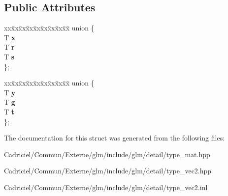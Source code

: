 \subsection*{Public Attributes}
\begin{DoxyCompactItemize}
\item 
\begin{tabbing}
xx\=xx\=xx\=xx\=xx\=xx\=xx\=xx\=xx\=\kill
union \{\\
\>T {\bfseries x}\\
\>T {\bfseries r}\\
\>T {\bfseries s}\\
\}; \hypertarget{structglm_1_1detail_1_1tvec2_afd7f3368f7e15406737f8fdcfa9a5ff3}{}\label{structglm_1_1detail_1_1tvec2_afd7f3368f7e15406737f8fdcfa9a5ff3}
\\

\end{tabbing}\item 
\begin{tabbing}
xx\=xx\=xx\=xx\=xx\=xx\=xx\=xx\=xx\=\kill
union \{\\
\>T {\bfseries y}\\
\>T {\bfseries g}\\
\>T {\bfseries t}\\
\}; \hypertarget{structglm_1_1detail_1_1tvec2_a21627d4405094fd892b5dbb0a672992c}{}\label{structglm_1_1detail_1_1tvec2_a21627d4405094fd892b5dbb0a672992c}
\\

\end{tabbing}\end{DoxyCompactItemize}


The documentation for this struct was generated from the following files\+:\begin{DoxyCompactItemize}
\item 
Cadriciel/\+Commun/\+Externe/glm/include/glm/detail/type\+\_\+mat.\+hpp\item 
Cadriciel/\+Commun/\+Externe/glm/include/glm/detail/type\+\_\+vec2.\+hpp\item 
Cadriciel/\+Commun/\+Externe/glm/include/glm/detail/type\+\_\+vec2.\+inl\end{DoxyCompactItemize}
